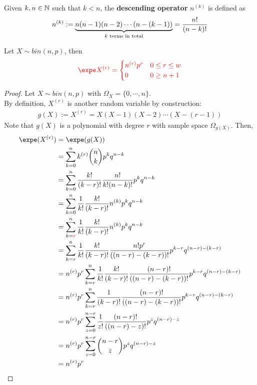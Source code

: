 \documentclass{article}
\begin{document}
   	\begin{definition}
   		Given $k, n \in \mathbb{N}$ such that $k < n$, the \textbf{descending operator} $n^{(k)}$ is defined as
   		\begin{align}
   			n^{(k)} := \underbrace{n (n-1) (n-2) \cdots (n-(k-1))}_{k\text{{ terms in total}}} = \frac{n!}{(n-k)!}
   		\end{align}
   	\end{definition}
   	
   	\begin{theorem}
   		Let $X \sim bin(n, p)$, then
   		\begin{align}
   			\red{\expe X^{(r)} = \begin{cases}
   				n^{(r)} p^r &0 \leq r \leq w \\
   				0 &0\geq n+1
   			\end{cases}}
   		\end{align}
   	\end{theorem}
   	
	\begin{proof}
		Let $X \sim bin(n, p)$ with $\Omega_X = \{0, \cdots, n\}$. \\
		By definition, $X^{(r)}$ is another random variable by construction:
		\begin{align}
			g(X) := X^{(r)} = X(X-1)(X-2)\cdots(X-(r-1))
		\end{align}
		Note that $g(X)$ is a polynomial with degree $r$ with sample space $\Omega_{g(X)}$. Then,
		\begin{align}
			\expe (X^{(r)}) &= \expe (g(X)) \\
			&= \sum_{k=0}^n k^{(r)} \binom{n}{k} p^k q^{n-k} \\
			&= \sum_{k=0}^n \frac{k!}{(k-r)!} \frac{n!}{k!(n-k)!} p^k q^{n-k} \\
			&= \sum_{k=0}^n \frac{1}{k!}\frac{k!}{(k-r)!} n^{(k)} p^k q^{n-k} \\
			&= \sum_{k=\red{r}}^n \frac{1}{k!}\frac{k!}{(k-r)!} n^{(k)} p^k q^{n-k} \\
			&= \sum_{k=r}^n \frac{1}{k!}\frac{k!}{(k-r)!} \frac{n! p^r}{((n-r) - (k-r))!} p^{k-r} q^{(n-r)-(k-r)}\\
			&= n^{(r)} p^r \sum_{k=r}^n \frac{1}{k!}\frac{k!}{(k-r)!} \frac{(n-r)!}{((n-r) - (k-r))!} p^{k-r} q^{(n-r)-(k-r)}\\
			&= n^{(r)} p^r \sum_{k=r}^n \frac{1}{(k-r)!} \frac{(n-r)!}{((n-r) - (k-r))!} p^{k-r} q^{(n-r)-(k-r)}\\
			&= n^{(r)} p^r \sum_{z=0}^{n-r} \frac{1}{z!} \frac{(n-r)!}{((n-r) - z)!} p^z q^{(n-r)-z}\\
			&= n^{(r)} p^r \sum_{z=0}^{n-r}\binom{n-r}{z} p^z q^{(n-r)-z}\\
			&= n^{(r)} p^r
		\end{align}
	\end{proof}
   	
\end{document}
